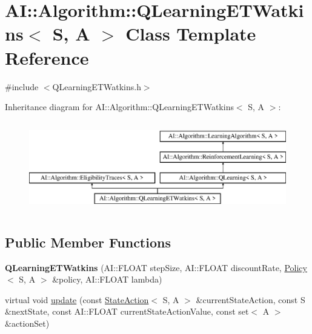 \hypertarget{classAI_1_1Algorithm_1_1QLearningETWatkins}{\section{A\-I\-:\-:Algorithm\-:\-:Q\-Learning\-E\-T\-Watkins$<$ S, A $>$ Class Template Reference}
\label{classAI_1_1Algorithm_1_1QLearningETWatkins}
}


{\ttfamily \#include $<$Q\-Learning\-E\-T\-Watkins.\-h$>$}

Inheritance diagram for A\-I\-:\-:Algorithm\-:\-:Q\-Learning\-E\-T\-Watkins$<$ S, A $>$\-:\begin{figure}[H]
\begin{center}
\leavevmode
\includegraphics[height=4.000000cm]{classAI_1_1Algorithm_1_1QLearningETWatkins}
\end{center}
\end{figure}
\subsection*{Public Member Functions}
\begin{DoxyCompactItemize}
\item 
\hypertarget{classAI_1_1Algorithm_1_1QLearningETWatkins_abac22ae85d556d147307aebf036b8a98}{{\bfseries Q\-Learning\-E\-T\-Watkins} (A\-I\-::\-F\-L\-O\-A\-T step\-Size, A\-I\-::\-F\-L\-O\-A\-T discount\-Rate, \hyperlink{classAI_1_1Algorithm_1_1Policy}{Policy}$<$ S, A $>$ \&policy, A\-I\-::\-F\-L\-O\-A\-T lambda)}\label{classAI_1_1Algorithm_1_1QLearningETWatkins_abac22ae85d556d147307aebf036b8a98}

\item 
virtual void \hyperlink{classAI_1_1Algorithm_1_1QLearningETWatkins_a5cbad8c16dfbf6fe72c85fe5c8c4e273}{update} (const \hyperlink{classAI_1_1StateAction}{State\-Action}$<$ S, A $>$ \&current\-State\-Action, const S \&next\-State, const A\-I\-::\-F\-L\-O\-A\-T current\-State\-Action\-Value, const set$<$ A $>$ \&action\-Set)
\end{DoxyCompactItemize}
